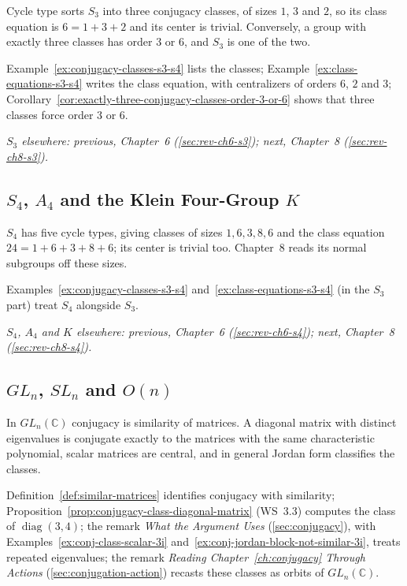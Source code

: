 \documentclass[11pt]{report}
\begin{document}
Cycle type sorts $S_3$ into three conjugacy classes, of sizes $1$, $3$ and $2$, so its class equation is $6 = 1 + 3 + 2$ and its center is trivial. Conversely, a group with exactly three classes has order $3$ or $6$, and $S_3$ is one of the two.

Example~\ref{ex:conjugacy-classes-s3-s4} lists the classes; Example~\ref{ex:class-equations-s3-s4} writes the class equation, with centralizers of orders $6$, $2$ and $3$; Corollary~\ref{cor:exactly-three-conjugacy-classes-order-3-or-6} shows that three classes force order $3$ or $6$.

\textit{$S_3$ elsewhere: previous, Chapter~6 (\ref{sec:rev-ch6-s3}); next, Chapter~8 (\ref{sec:rev-ch8-s3}).}

\subsection{\texorpdfstring{$S_4$, $A_4$ and the Klein Four-Group $K$}{S₄, A₄ and the Klein Four-Group K}}\label{sec:rev-ch7-s4}

$S_4$ has five cycle types, giving classes of sizes $1, 6, 3, 8, 6$ and the class equation $24 = 1 + 6 + 3 + 8 + 6$; its center is trivial too. Chapter~8 reads its normal subgroups off these sizes.

Examples~\ref{ex:conjugacy-classes-s3-s4} and~\ref{ex:class-equations-s3-s4} (in the $S_3$ part) treat $S_4$ alongside $S_3$.

\textit{$S_4$, $A_4$ and $K$ elsewhere: previous, Chapter~6 (\ref{sec:rev-ch6-s4}); next, Chapter~8 (\ref{sec:rev-ch8-s4}).}

\subsection{\texorpdfstring{$GL_n$, $SL_n$ and $O(n)$}{GLₙ, SLₙ and O(n)}}\label{sec:rev-ch7-gl}

In $GL_n(\mathbb{C})$ conjugacy is similarity of matrices. A diagonal matrix with distinct eigenvalues is conjugate exactly to the matrices with the same characteristic polynomial, scalar matrices are central, and in general Jordan form classifies the classes.

Definition~\ref{def:similar-matrices} identifies conjugacy with similarity; Proposition~\ref{prop:conjugacy-class-diagonal-matrix} (WS~3.3) computes the class of $\operatorname{diag}(3, 4)$; the remark \emph{What the Argument Uses} (\ref{sec:conjugacy}), with Examples~\ref{ex:conj-class-scalar-3i} and~\ref{ex:conj-jordan-block-not-similar-3i}, treats repeated eigenvalues; the remark \emph{Reading Chapter~\ref{ch:conjugacy} Through Actions} (\ref{sec:conjugation-action}) recasts these classes as orbits of $GL_n(\mathbb{C})$.
\end{document}
